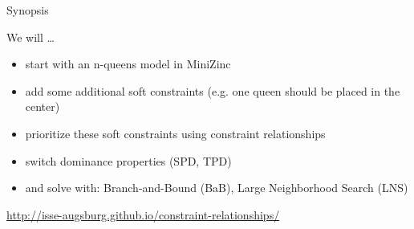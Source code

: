 \documentclass[10pt,xcolor={dvipsnames},fleqn]{beamer}
\newcommand{\cemph}[1]{\alert{#1}}
\begin{document}
%
%

\begin{frame}{Synopsis}

\vspace*{2ex}
We will \ldots
\begin{itemize}
\item start with an \alert{n-queens model} in MiniZinc
\item add some additional soft constraints (e.g. one queen should be placed in the \alert{center})
\item prioritize these soft constraints using \alert{constraint relationships}
\item switch dominance properties (SPD, TPD) 
\item and \alert{solve} with: Branch-and-Bound (BaB), Large Neighborhood Search (LNS)
\end{itemize}

\vspace*{2ex}

\url{http://isse-augsburg.github.io/constraint-relationships/}
\end{frame}
\end{document}
